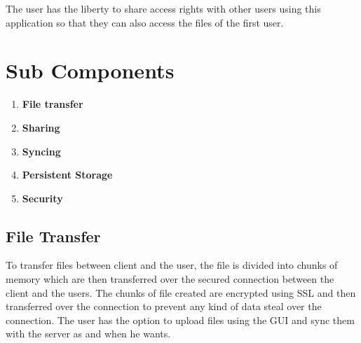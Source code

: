 \documentclass[11pt,fleqn]{book} %
\begin{document}
The user has the liberty to share access rights with other users using this application so that they can also access the files of the first user.
\\
\section{Sub Components}
\begin{enumerate}
\item \textbf{File transfer} 
\item \textbf{Sharing}
\item \textbf{Syncing}
\item \textbf{Persistent Storage}
\item \textbf{Security}

\end{enumerate}


\subsection{File Transfer}
To transfer files between client and the user, the file is divided into chunks of memory which are then transferred over the secured connection between the client and the users. The chunks of file created are encrypted using SSL and then transferred over the connection to prevent any kind of data steal over the connection. The user has the option to upload files using the GUI and sync them with the server as and when he wants.
\end{document}
